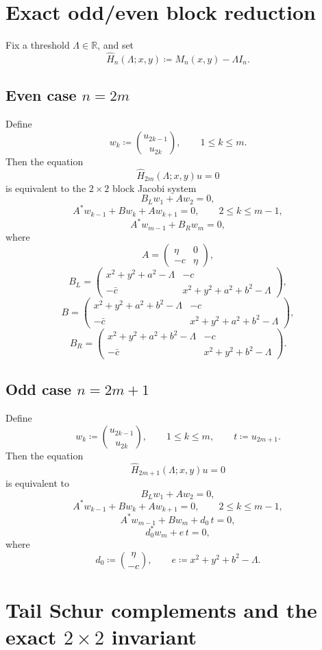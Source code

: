 \documentclass[11pt]{article}
\newcommand{\R}{\mathbb R}
\begin{document}
\section{Exact odd/even block reduction}

Fix a threshold \(\Lambda\in\R\), and set
\[
\widehat H_n(\Lambda;x,y)\coloneqq M_n(x,y)-\Lambda I_n.
\]

\subsection*{Even case \(n=2m\)}

Define
\[
w_k\coloneqq \binom{u_{2k-1}}{u_{2k}},
\qquad
1\le k\le m.
\]
Then the equation
\[
\widehat H_{2m}(\Lambda;x,y)u=0
\]
is equivalent to the \(2\times2\) block Jacobi system
\[
B_Lw_1+Aw_2=0,
\]
\[
A^*w_{k-1}+Bw_k+Aw_{k+1}=0,
\qquad 2\le k\le m-1,
\]
\[
A^*w_{m-1}+B_Rw_m=0,
\]
where
\[
A=
\begin{pmatrix}
\eta & 0\\
-c & \eta
\end{pmatrix},
\]
\[
B_L=
\begin{pmatrix}
x^2+y^2+a^2-\Lambda & -c\\
-\bar c & x^2+y^2+a^2+b^2-\Lambda
\end{pmatrix},
\]
\[
B=
\begin{pmatrix}
x^2+y^2+a^2+b^2-\Lambda & -c\\
-\bar c & x^2+y^2+a^2+b^2-\Lambda
\end{pmatrix},
\]
\[
B_R=
\begin{pmatrix}
x^2+y^2+a^2+b^2-\Lambda & -c\\
-\bar c & x^2+y^2+b^2-\Lambda
\end{pmatrix}.
\]

\subsection*{Odd case \(n=2m+1\)}

Define
\[
w_k\coloneqq \binom{u_{2k-1}}{u_{2k}},
\qquad
1\le k\le m,
\qquad
t\coloneqq u_{2m+1}.
\]
Then the equation
\[
\widehat H_{2m+1}(\Lambda;x,y)u=0
\]
is equivalent to
\[
B_Lw_1+Aw_2=0,
\]
\[
A^*w_{k-1}+Bw_k+Aw_{k+1}=0,
\qquad 2\le k\le m-1,
\]
\[
A^*w_{m-1}+Bw_m+d_0\,t=0,
\]
\[
d_0^*w_m+e\,t=0,
\]
where
\[
d_0\coloneqq \binom{\eta}{-c},
\qquad
e\coloneqq x^2+y^2+b^2-\Lambda.
\]

\section{Tail Schur complements and the exact \(2\times2\) invariant}
\end{document}
